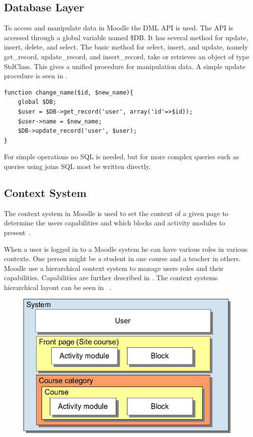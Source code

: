 \subsection{Database Layer}
\label{sec:moodleoplatformdbml}
To access and manipulate data in Moodle the DML API is used.  The API is accessed through a global variable named \$DB. It has several method for update, insert, delete, and select. 
The basic method for select, insert, and update, namely get\_record, update\_record, and insert\_record, take or retrieves an object of type StdClass. This gives a unified procedure for manipulation data. A simple update procedure is seen in .
\begin{lstlisting}[style=phpCode, caption=\myCaption{Example of how to change the name of an user}, label=moodlecodeupdate]
function change_name($id, $new_name){
	global $DB;
	$user = $DB->get_record('user', array('id'=>$id));
	$user->name = $new_name;
	$DB->update_record('user', $user);
}
\end{lstlisting}
For simple operations no SQL is needed, but for more complex queries such as queries using joins SQL most be written directly. 



\subsection{Context System}
\label{sub:contextsystem}
The context system in Moodle is used to set the context of a given page to determine the users capabilities and which blocks and activity modules to present~\cite{moodlerolesandmodules}.
 
When a user is logged in to a Moodle system he can have various roles in various contexts. 
One person might be a student in one course and a teacher in others. 
Moodle use a hierarchical context system to manage users roles and their capabilities. 
Capabilities are further described in . 
The context systems hierarchical layout can be seen in ~\cite{moodlefilemoodlecontext}.
 
 \begin{figure}
	 \centering
		 \includegraphics[width=\textwidth]{images/moodle-contexts.png}
	 \label{fig:moodle-contexts}
 \end{figure}


